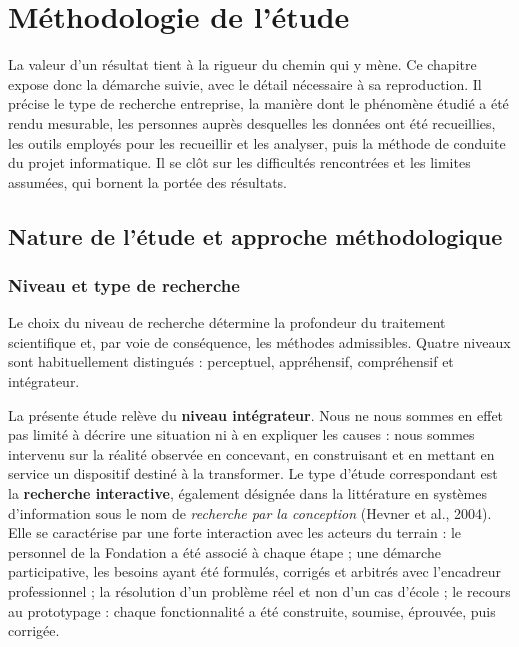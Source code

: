 \chapter{Méthodologie de l'étude}
\label{chap:methodo}

\introchap

La valeur d'un résultat tient à la rigueur du chemin qui y mène. Ce chapitre
expose donc la démarche suivie, avec le détail nécessaire à sa reproduction. Il
précise le type de recherche entreprise, la manière dont le phénomène étudié a
été rendu mesurable, les personnes auprès desquelles les données ont été
recueillies, les outils employés pour les recueillir et les analyser, puis la
méthode de conduite du projet informatique. Il se clôt sur les difficultés
rencontrées et les limites assumées, qui bornent la portée des résultats.

\section{Nature de l'étude et approche méthodologique}
\label{sec:nature}

\subsection{Niveau et type de recherche}

Le choix du niveau de recherche détermine la profondeur du traitement
scientifique et, par voie de conséquence, les méthodes admissibles. Quatre
niveaux sont habituellement distingués : perceptuel, appréhensif, compréhensif
et intégrateur.

La présente étude relève du \textbf{niveau intégrateur}. Nous ne nous sommes en
effet pas limité à décrire une situation ni à en expliquer les causes : nous
sommes intervenu sur la réalité observée en concevant, en construisant et en
mettant en service un dispositif destiné à la transformer. Le type d'étude
correspondant est la \textbf{recherche interactive}, également désignée dans la
littérature en systèmes d'information sous le nom de \emph{recherche par la
conception} (Hevner et al., 2004). Elle se caractérise par une forte
interaction avec les acteurs du terrain : le personnel de la
Fondation a été associé à chaque étape ; une démarche participative, les
besoins ayant été formulés, corrigés et arbitrés avec l'encadreur
professionnel ; la résolution d'un problème réel et non d'un cas d'école ; le
recours au prototypage : chaque fonctionnalité a été construite, soumise,
éprouvée, puis corrigée.

